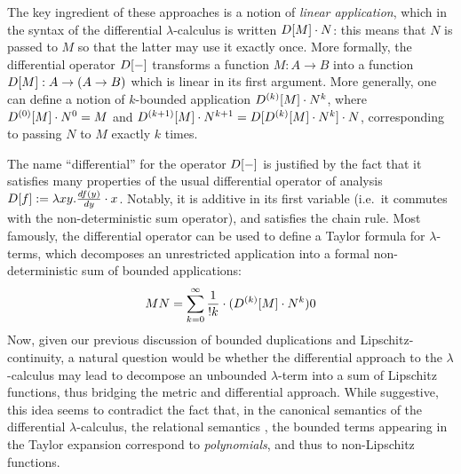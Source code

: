 The key ingredient of these approaches is a notion of \emph{linear application}, which in the syntax of the differential $\lambda$-calculus is written $\Der[M]\cdot N$: this means that $N$ is passed to $M$ so that the latter may use it exactly once. More formally, the differential operator $\Der[-]$ transforms a function $M:A\to B$ into a function $\Der[M]: A\to (A\to B)$ which is linear in its first argument. 
More generally, one can define a notion of $k$-bounded application $\Der^{(k)}[M]\cdot N^{k}$, where $\Der^{(0)}[M]\cdot N^{0}= M$ and $\Der^{(k+1)}[M]\cdot N^{k+1}= \Der[ \Der^{(k)}[M]\cdot N^{k}]\cdot N$, corresponding to passing $N$ to $M$ exactly $k$ times.
%

The name ``differential'' for the operator $\Der[-]$ is justified by the fact that it satisfies many properties of the usual differential operator of analysis $\Der[f]:= \lambda xy. \frac{\mathsf df(y)}{\mathsf dy}\cdot x$. Notably, it is additive in its first variable (i.e.~it commutes with the non-deterministic sum operator), and satisfies the chain rule.
Most famously, the differential operator can be used to define a Taylor formula for $\lambda$-terms, which decomposes an unrestricted application into a formal non-deterministic sum of bounded applications:
\begin{align}
MN  =  \sum_{k=0}^{\infty}\frac{1}{!k}\cdot (\Der^{(k)}[M] \cdot N^{k})0
\end{align}
Now, given our previous discussion of bounded duplications and Lipschitz-continuity, a natural question would be whether the differential approach to the $\lambda$-calculus may lead to decompose an unbounded $\lambda$-term 
into a sum of Lipschitz functions, thus bridging the metric and differential approach.  
While suggestive, this idea seems to contradict the fact that, in the canonical semantics of the differential $\lambda$-calculus, the relational semantics \cite{}, the bounded terms appearing in the Taylor expansion correspond to \emph{polynomials}, and thus to non-Lipschitz functions. 


